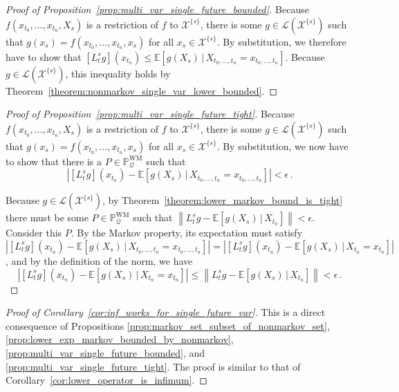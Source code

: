 \documentclass[10pt]{paper}
\theoremstyle{definition}
\newcommand{\states}{\mathcal{X}}
\newcommand{\processes}{\mathbb{P}}
\newcommand{\wmprocesses}{\processes^{\mathrm{WM}}}
\newcommand{\gambles}{\mathcal{L}}
\newcommand{\rateset}{\mathcal{Q}}
\newcommand{\norm}[1]{\left\lVert #1 \right\rVert}
\newcommand{\abs}[1]{\left\vert #1 \right\vert}
\begin{document}
\begin{proof}[Proof of Proposition~\ref{prop:multi_var_single_future_bounded}]
Because $f(x_{t_0},\ldots,x_{t_n},X_s)$ is a restriction of $f$ to $\states^{\{s\}}$, there is some $g\in\gambles(\states^{\{s\}})$ such that $g(x_s) = f(x_{t_0},\ldots,x_{t_n},x_s)$ for all $x_s\in\states^{\{s\}}$. By substitution, we therefore have to show that $\left[L_t^sg\right](x_{t_n}) \leq \mathbb{E}\left[g(X_s)\,\vert\,X_{t_0,\ldots,t_n}=x_{t_0,\ldots,t_n}\right]$. Because $g\in\gambles(\states^{\{s\}})$, this inequality holds by Theorem~\ref{theorem:nonmarkov_single_var_lower_bounded}.
\end{proof}

\begin{proof}[Proof of Proposition~\ref{prop:multi_var_single_future_tight}]
Because $f(x_{t_0},\ldots,x_{t_n},X_s)$ is a restriction of $f$ to $\states^{\{s\}}$, there is some $g\in\gambles(\states^{\{s\}})$ such that $g(x_s) = f(x_{t_0},\ldots,x_{t_n},x_s)$ for all $x_s\in\states^{\{s\}}$. By substitution, we now have to show that there is a $P\in\wmprocesses_\rateset$ such that
\begin{equation*}
\abs{\left[L_t^sg\right](x_{t_n})-\mathbb{E}[g(X_s)\,\vert\,X_{t_0,\ldots,t_n}=x_{t_0,\ldots,t_n}]} < \epsilon\,. 
\end{equation*}

Because $g\in\gambles(\states^{\{s\}})$, by Theorem~\ref{theorem:lower_markov_bound_is_tight} there must be some $P\in\wmprocesses_\rateset$ such that $\norm{L_t^sg - \mathbb{E}[g(X_s)\,\vert\,X_{t_n}]} < \epsilon$. Consider this $P$. By the Markov property, its expectation must satisfy $\abs{\left[L_t^sg\right](x_{t_n})-\mathbb{E}[g(X_s)\,\vert\,X_{t_0,\ldots,t_n}=x_{t_0,\ldots,t_n}]} = \abs{\left[L_t^sg\right](x_{t_n})-\mathbb{E}[g(X_s)\,\vert\,X_{t_n}=x_{t_n}]}$, and by the definition of the norm, we have 
\begin{equation*}
\abs{\left[L_t^sg\right](x_{t_n})-\mathbb{E}[g(X_s)\,\vert\,X_{t_n}=x_{t_n}]} \leq \norm{L_t^sg-\mathbb{E}[g(X_s)\,\vert\,X_{t_n}]} < \epsilon\,.
\end{equation*}
\end{proof}

\begin{proof}[Proof of Corollary~\ref{cor:inf_works_for_single_future_var}]
This is a direct consequence of Propositions \ref{prop:markov_set_subset_of_nonmarkov_set}, \ref{prop:lower_exp_markov_bounded_by_nonmarkov}, \ref{prop:multi_var_single_future_bounded}, and \ref{prop:multi_var_single_future_tight}. The proof is similar to that of Corollary~\ref{cor:lower_operator_is_infimum}.
\end{proof}
\end{document}
